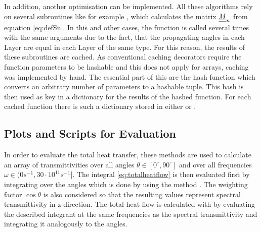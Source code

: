 In addition, another optimisation can be implemented. All these algorithms rely
on several subroutines like for example , which
calculates the matrix $\underline{\underline{M}}_n$ from equation \ref{eq:defSn}. In this and
other cases, the function is called several times with the same arguments due
to the fact, that the propagating angles in each Layer are equal in each Layer
of the same type. For this reason, the results of these subroutines are cached.
As conventional caching decorators require the function parameters to be
hashable and this does not apply for  arrays, caching was
implemented by hand. The essential part of this are the hash function
 which converts an arbitrary number of parameters to a hashable
tuple. This hash is then used as key in a dictionary for the results of the
hashed function. For each cached function there is such a dictionary stored in
either  or .



\subsection{Plots and Scripts for Evaluation}
In order to evaluate the total heat transfer, these methods are used to
calculate an array of transmittivities over all angles
$\theta\in[0^{\circ},90^{\circ}]$ and over all frequencies
$\omega \in (0\si{s^{-1}}, 30\cdot 10^{11}\si{s^{-1}}] $. The integral
\ref{eq:totalheatflow} is then evaluated first by integrating over the angles
which is done by  using the method
. The weighting factor $\cos \theta$ is also considered so
that the resulting values represent spectral transmittivity in z-direction.
The total heat flow is calculated with  by evaluating
the described integrant at the same frequencies as the spectral transmittivity
and integrating it analogously to the angles. 


